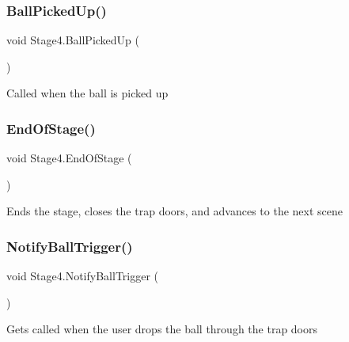 \mbox{\label{class_stage4_aeb84711e7a42d39c057d74c7d7a1fe17}} 
\subsubsection{\texorpdfstring{Ball\+Picked\+Up()}{BallPickedUp()}}
{\footnotesize\ttfamily void Stage4.\+Ball\+Picked\+Up (\begin{DoxyParamCaption}{ }\end{DoxyParamCaption})\hspace{0.3cm}{\ttfamily [private]}}



Called when the ball is picked up 

\mbox{\label{class_stage4_a972d03f467d6ce6fd2de56b541b85a3b}} 
\subsubsection{\texorpdfstring{End\+Of\+Stage()}{EndOfStage()}}
{\footnotesize\ttfamily void Stage4.\+End\+Of\+Stage (\begin{DoxyParamCaption}{ }\end{DoxyParamCaption})\hspace{0.3cm}{\ttfamily [private]}}



Ends the stage, closes the trap doors, and advances to the next scene 

\mbox{\label{class_stage4_a3b96ad980e2129d1fcb619673921c233}} 
\subsubsection{\texorpdfstring{Notify\+Ball\+Trigger()}{NotifyBallTrigger()}}
{\footnotesize\ttfamily void Stage4.\+Notify\+Ball\+Trigger (\begin{DoxyParamCaption}{ }\end{DoxyParamCaption})}



Gets called when the user drops the ball through the trap doors 

